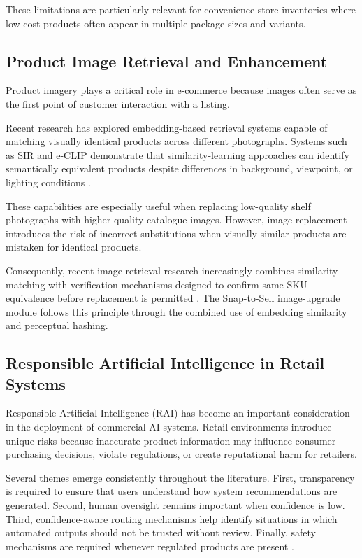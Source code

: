 \documentclass[conference]{IEEEtran}
\begin{document}
These limitations are particularly relevant for convenience-store
inventories where low-cost products often appear in multiple package sizes
and variants.

\subsection{Product Image Retrieval and Enhancement}

Product imagery plays a critical role in e-commerce because images often
serve as the first point of customer interaction with a listing.

Recent research has explored embedding-based retrieval systems capable of
matching visually identical products across different photographs.
Systems such as SIR and e-CLIP demonstrate that similarity-learning
approaches can identify semantically equivalent products despite
differences in background, viewpoint, or lighting conditions
\cite{sir2020,eclip2022}.

These capabilities are especially useful when replacing low-quality shelf
photographs with higher-quality catalogue images. However, image
replacement introduces the risk of incorrect substitutions when visually
similar products are mistaken for identical products.

Consequently, recent image-retrieval research increasingly combines
similarity matching with verification mechanisms designed to confirm
same-SKU equivalence before replacement is permitted
\cite{sir2020,eclip2022}. The Snap-to-Sell image-upgrade module follows
this principle through the combined use of embedding similarity and
perceptual hashing.

\subsection{Responsible Artificial Intelligence in Retail Systems}

Responsible Artificial Intelligence (RAI) has become an important
consideration in the deployment of commercial AI systems. Retail
environments introduce unique risks because inaccurate product
information may influence consumer purchasing decisions, violate
regulations, or create reputational harm for retailers.

Several themes emerge consistently throughout the literature. First,
transparency is required to ensure that users understand how system
recommendations are generated. Second, human oversight remains important
when confidence is low. Third, confidence-aware routing mechanisms help
identify situations in which automated outputs should not be trusted
without review. Finally, safety mechanisms are required whenever regulated
products are present \cite{li2024modict}.
\end{document}
